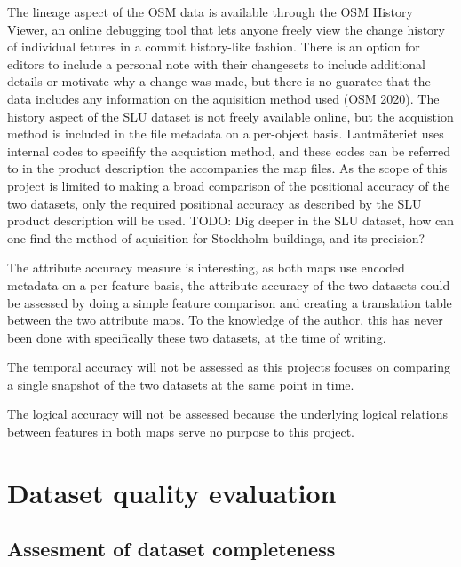 \documentclass[a4paper]{article}
\begin{document}
The lineage aspect of the OSM data is available through the OSM History Viewer, an online debugging tool that lets anyone freely view the change history of individual fetures in a commit history-like fashion. There is an option for editors to include a personal note with their changesets to include additional details or motivate why a change was made, but there is no guaratee that the data includes any information on the aquisition method used (OSM 2020). The history aspect of the SLU dataset is not freely available online, but the acquistion method is included in the file metadata on a per-object basis. Lantmäteriet uses internal codes to specifify the acquistion method, and these codes can be referred to in the product description the accompanies the map files. As the scope of this project is limited to making a broad comparison of the positional accuracy of the two datasets, only the required positional accuracy as described by the SLU product description will be used.
TODO: Dig deeper in the SLU dataset, how can one find the method of aquisition for Stockholm buildings, and its precision?

The attribute accuracy measure is interesting, as both maps use encoded metadata on a per feature basis, the attribute accuracy of the two datasets could be assessed by doing a simple feature comparison and creating a translation table between the two attribute maps. To the knowledge of the author, this has never been done with specifically these two datasets, at the time of writing.

The temporal accuracy will not be assessed as this projects focuses on comparing a single snapshot of the two datasets at the same point in time.

The logical accuracy will not be assessed because the underlying logical relations between features in both maps serve no purpose to this project.

\section{Dataset quality evaluation}

\subsection{Assesment of dataset completeness}
\end{document}
